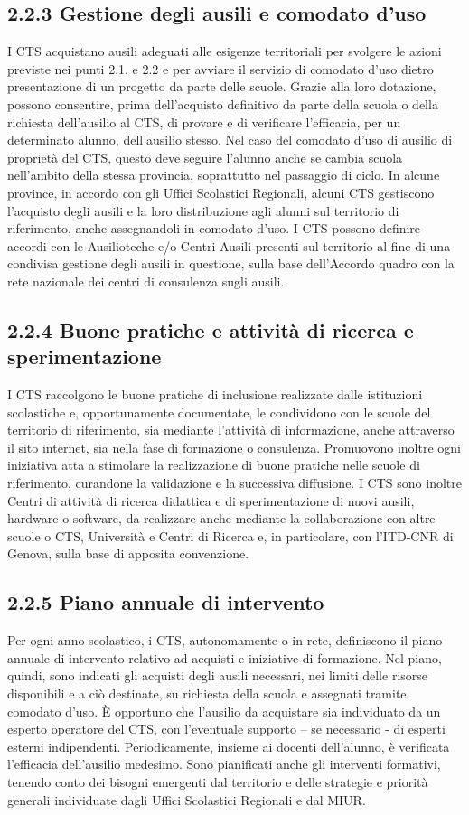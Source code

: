 \subsection*{2.2.3 Gestione degli ausili e comodato d'uso}
I CTS acquistano ausili adeguati alle esigenze territoriali per svolgere le azioni previste nei punti 2.1. e 2.2 e
per avviare il servizio di comodato d'uso dietro presentazione di un progetto da parte delle scuole. Grazie
alla loro dotazione, possono consentire, prima dell'acquisto definitivo da parte della scuola o della richiesta
dell'ausilio al CTS, di provare e di verificare l'efficacia, per un determinato alunno, dell'ausilio stesso.
Nel caso del comodato d'uso di ausilio di proprietà del CTS, questo deve seguire l'alunno anche se cambia
scuola nell'ambito della stessa provincia, soprattutto nel passaggio di ciclo. In alcune province, in accordo con
gli Uffici Scolastici Regionali, alcuni CTS gestiscono l'acquisto degli ausili e la loro distribuzione agli alunni
sul territorio di riferimento, anche assegnandoli in comodato d'uso.
I CTS possono definire accordi con le Ausilioteche e/o Centri Ausili presenti sul territorio al fine di una
condivisa gestione degli ausili in questione, sulla base dell'Accordo quadro con la rete nazionale dei centri di
consulenza sugli ausili.
\subsection*{2.2.4 Buone pratiche e attività di ricerca e sperimentazione}
I CTS raccolgono le buone pratiche di inclusione realizzate dalle istituzioni scolastiche e, opportunamente
documentate, le condividono con le scuole del territorio di riferimento, sia mediante l'attività di
informazione, anche attraverso il sito internet, sia nella fase di formazione o consulenza. Promuovono inoltre
ogni iniziativa atta a stimolare la realizzazione di buone pratiche nelle scuole di riferimento, curandone la
validazione e la successiva diffusione.
I CTS sono inoltre Centri di attività di ricerca didattica e di sperimentazione di nuovi ausili, hardware o
software, da realizzare anche mediante la collaborazione con altre scuole o CTS, Università e Centri di
Ricerca e, in particolare, con l'ITD-CNR di Genova, sulla base di apposita convenzione.
\subsection*{2.2.5 Piano annuale di intervento}
Per ogni anno scolastico, i CTS, autonomamente o in rete, definiscono il piano annuale di intervento relativo
ad acquisti e iniziative di formazione. Nel piano, quindi, sono indicati gli acquisti degli ausili necessari, nei
limiti delle risorse disponibili e a ciò destinate, su richiesta della scuola e assegnati tramite comodato d'uso.
È opportuno che l'ausilio da acquistare sia individuato da un esperto operatore del CTS, con l'eventuale
supporto – se necessario - di esperti esterni indipendenti. Periodicamente, insieme ai docenti dell'alunno, è
verificata l'efficacia dell'ausilio medesimo.
Sono pianificati anche gli interventi formativi, tenendo conto dei bisogni emergenti dal territorio e delle
strategie e priorità generali individuate dagli Uffici Scolastici Regionali e dal MIUR.
